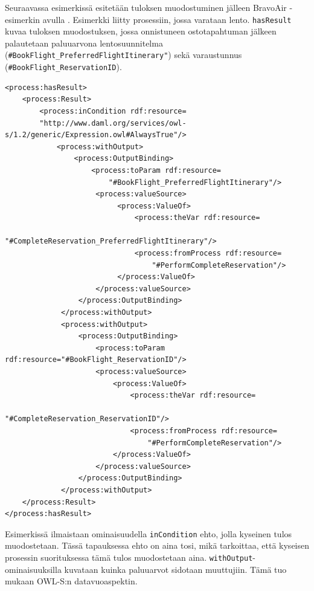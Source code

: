 \documentclass[finnish]{tktltiki2}
\theoremstyle{definition}
\theoremstyle{remark}
\begin{document}
Seuraavassa esimerkissä esitetään tuloksen muodostuminen jälleen BravoAir -esimerkin avulla \cite{daml}. Esimerkki liitty prosessiin, jossa varataan lento. \texttt{hasResult} kuvaa tuloksen muodostuksen, jossa onnistuneen ostotapahtuman jälkeen palautetaan paluuarvona lentosuunnitelma (\texttt{\#BookFlight\_PreferredFlightItinerary"}) sekä varaustunnus (\texttt{\#BookFlight\_ReservationID}). 

\footnotesize
\begin{verbatim}
<process:hasResult>
    <process:Result>
        <process:inCondition rdf:resource=
        "http://www.daml.org/services/owl-s/1.2/generic/Expression.owl#AlwaysTrue"/>
            <process:withOutput>
                <process:OutputBinding>
                    <process:toParam rdf:resource=
                        "#BookFlight_PreferredFlightItinerary"/>
                     <process:valueSource>
                          <process:ValueOf>
                              <process:theVar rdf:resource=
                                  "#CompleteReservation_PreferredFlightItinerary"/>
                              <process:fromProcess rdf:resource=
                                  "#PerformCompleteReservation"/>
                          </process:ValueOf>
                     </process:valueSource>
                 </process:OutputBinding>
             </process:withOutput>
             <process:withOutput>
                 <process:OutputBinding>
                     <process:toParam rdf:resource="#BookFlight_ReservationID"/>
                     <process:valueSource>
                         <process:ValueOf>
                             <process:theVar rdf:resource=
                                 "#CompleteReservation_ReservationID"/>
                             <process:fromProcess rdf:resource=
                                 "#PerformCompleteReservation"/>
                         </process:ValueOf>
                     </process:valueSource>
                 </process:OutputBinding>
             </process:withOutput>
    </process:Result>
</process:hasResult>
\end{verbatim}

\normalsize


Esimerkissä ilmaistaan ominaisuudella \texttt{inCondition} ehto, jolla kyseinen tulos muodostetaan. Tässä tapauksessa ehto on aina tosi, mikä tarkoittaa, että kyseisen prosessin suorituksessa tämä tulos muodostetaan aina. \texttt{withOutput}-ominaisuuksilla kuvataan kuinka paluuarvot sidotaan muuttujiin. Tämä tuo mukaan OWL-S:n datavuoaspektin. 
\end{document}
